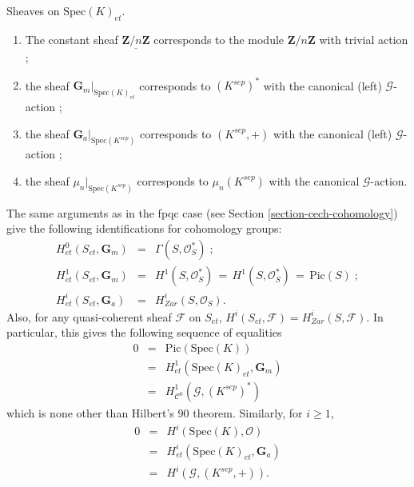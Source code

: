 \begin{example}
\label{example-sheaves-point}
Sheaves on $\text{Spec}(K)_{et}$.
\begin{enumerate}
\item The constant sheaf $\underline{\mathbf{Z}/n\mathbf{Z}}$ corresponds to
the module $\mathbf{Z}/n\mathbf{Z}$ with trivial action ;
\item the sheaf $\mathbf{G}_m|_{\text{Spec}(K)_{et}}$ corresponds to
$(K^{sep})^*$ with the canonical (left) $\mathcal{G}$-action ;
\item the sheaf $\mathbf{G}_a|_{\text{Spec}(K^{sep})}$ corresponds to
$(K^{sep}, +)$ with the canonical (left) $\mathcal{G}$-action ;
\item the sheaf $\mu_n|_{\text{Spec}(K^{sep})}$ corresponds to $\mu_n(K^{sep})$
with the canonical $\mathcal{G}$-action.
\end{enumerate}

\noindent
The same arguments as in the fpqc case (see
Section \ref{section-cech-cohomology})
give the following identifications for cohomology groups:
$$
\begin{matrix}
H_{et}^0(S_{et}, \mathbf{G}_m) & = & \Gamma(S, \mathcal{O}_S^*) \; ; \\
H_{et}^1(S_{et}, \mathbf{G}_m) & = & H^1(S, \mathcal{O}_S^*) \, = \, H^1(S,
\mathcal{O}_S^*) \, = \, \text{Pic}(S) \; ;\\
H_{et}^i(S_{et}, \mathbf{G}_a) & = & H_{Zar}^i(S, \mathcal{O}_S).
\end{matrix}
$$
Also, for any quasi-coherent sheaf $\mathcal{F}$ on $S_{et}$, $H^i(S_{et},
\mathcal{F}) = H_{Zar}^i(S, \mathcal{F})$.
In particular, this gives the following sequence of equalities
\begin{eqnarray*}
0 & = & \text{Pic}(\text{Spec}(K)) \\
& = & H_{et}^1(\text{Spec}(K)_{et}, \mathbf{G}_m) \\
& = & H^1_{\mathcal{C}^0}(\mathcal{G}, (K^{sep})^*)
\end{eqnarray*}
which is none other than Hilbert's 90 theorem. Similarly, for $i \geq 1$,
\begin{eqnarray*}
0 & = & H^i(\text{Spec}(K), \mathcal{O}) \\
& = & H_{et}^i(\text{Spec}(K)_{et}, \mathbf{G}_a) \\
& = & H^i(\mathcal{G}, (K^{sep}, +)).
\end{eqnarray*}
\end{example}





